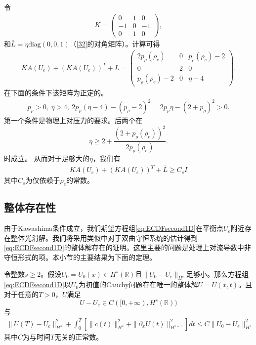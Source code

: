 令
\begin{eqnarray}\label{33}
K=\left( \begin{array}{ccc}
	0 & 1 & 0 \\
	-1 & 0 & -1 \\
	0 & 1 & 0
	\end{array} \right),
\end{eqnarray}
和$\bar{L} = \eta\mbox{diag}(0, 0, 1)$（\eqref{32}的对角矩阵）。计算可得
\begin{eqnarray*}
K A(U_e) + (K A(U_e))^T + \bar{L} =
	\left( \begin{array}{ccc}
	2p_\rho(\rho_e) & 0 & p_\rho(\rho_e) -2  \\
	0 & 2 & 0 \\
	p_\rho(\rho_e) - 2 & 0 & \eta -4 	
	\end{array} \right).
\end{eqnarray*}
在下面的条件下该矩阵为正定的。
\begin{eqnarray*}
p_\rho  > 0, \ \eta > 4, \ 2p_\rho(\eta - 4)-(p_{\rho}-2)^2 = 2 p_\rho\eta  - (2 +  p_\rho)^2 >0.
\end{eqnarray*}
第一个条件是物理上对压力的要求。后两个在
$$
\eta \ge 2 +\frac{(2 +  p_\rho(\rho_e))^2}{2 p_\rho(\rho_e)}.
$$
时成立。
从而对于足够大的$\eta$，我们有
\begin{eqnarray}\label{35}
K A(U_e) + (K A(U_e))^T + \bar{L} \ge C_s I
\end{eqnarray}
其中$C_s$为仅依赖于$\rho_e$的常数。

\subsection{整体存在性}
由于Kawashima条件成立，我们期望方程组\eqref{eq:ECDFsecond1D}在平衡点$U_e$附近存在整体光滑解。我们将采用类似\cite{yong2004entropy,kawashima2009decay}中对于双曲守恒系统的估计得到\eqref{eq:ECDFsecond1D}的整体解存在的证明。这里主要的问题是处理上对流导数中非守恒形式的项。本小节的主要结果为下面的定理。

\begin{theorem} \label{theoremglobal}
令整数$s \ge 2$。假设$U_0=U_0(x) \in H^s(\mathbb{R})$且$\|U_0 -U_e\|_{H^s}$足够小。那么方程组\eqref{eq:ECDFsecond1D}以$U_0$为初值的Cauchy问题存在唯一的整体解$U=U(x,t)$。且对于任意的$T>0$，$U$满足
$$
U-U_e \in C([0,+\infty),H^s(\mathbb{R}))
$$
与
\begin{eqnarray}\label{41}
\|U(T)-U_e\|^2_{H^s} + \int_0^T \left[ \|c(t)\|^2_{H^s} + \|\partial_x U(t)\|^2_{H^{s-1}} \right] dt \le C \|U_0 -U_e\|^2_{H^s}
\end{eqnarray}
其中$C$为与时间$T$无关的正常数。
\end{theorem}

